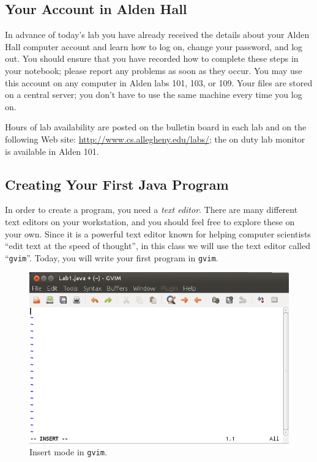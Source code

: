 \vspace*{-.3in}
\subsection*{Your Account in Alden Hall}

In advance of today's lab you have already received the details about your Alden Hall computer account and learn how to
log on, change your password, and log out.  You should ensure that you have recorded how to complete these steps in your
notebook; please report any problems as soon as they occur. You may use this account on any computer in Alden labs 101,
103, or 109. Your files are stored on a central server; you don't have to use the same machine every time you log on.

Hours of lab availability are posted on the bulletin board in each lab and on the following Web site:
\url{http://www.cs.allegheny.edu/labs/}; the on duty lab monitor is available in Alden 101.

\vspace*{-.1in}
\subsection*{Creating Your First Java Program}

In order to create a program, you need a {\em text editor}. There are many different text editors on your workstation, and
you should feel free to explore these on your own. Since it is a powerful text editor known for helping computer
scientists ``edit text at the speed of thought'', in this class we will use the text editor called ``{\tt gvim}''.
Today, you will write your first program in {\tt gvim}.


\begin{figure}[htbp]
  \centering
  \includegraphics[width=4.5in]{images/gvim-insert}
  \caption{Insert mode in {\tt gvim}.}
  \label{gvim-insert}
\end{figure}

